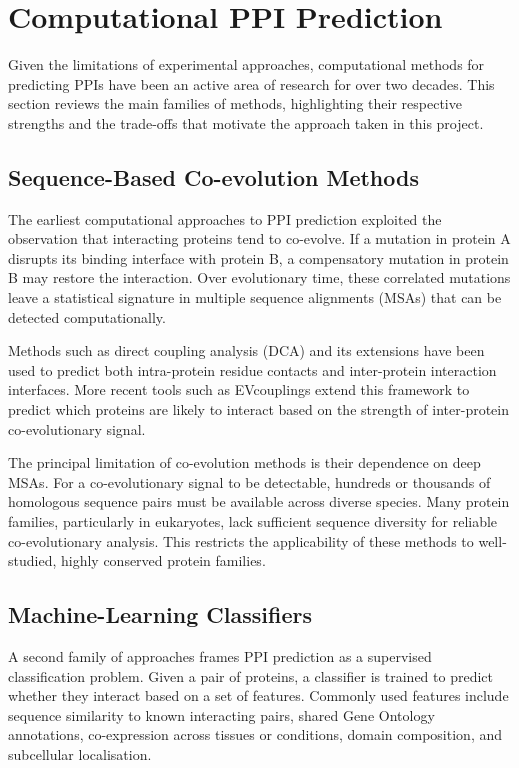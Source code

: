 \section{Computational PPI Prediction}
\label{sec:bg-comp-ppi}

Given the limitations of experimental approaches, computational methods for predicting PPIs have been an active area of research for over two decades.
This section reviews the main families of methods, highlighting their respective strengths and the trade-offs that motivate the approach taken in this project.

\subsection{Sequence-Based Co-evolution Methods}

The earliest computational approaches to PPI prediction exploited the observation that interacting proteins tend to co-evolve.
If a mutation in protein A disrupts its binding interface with protein B, a compensatory mutation in protein B may restore the interaction.
Over evolutionary time, these correlated mutations leave a statistical signature in multiple sequence alignments (MSAs) that can be detected computationally.

Methods such as direct coupling analysis (DCA) and its extensions have been used to predict both intra-protein residue contacts and inter-protein interaction interfaces.
More recent tools such as EVcouplings extend this framework to predict which proteins are likely to interact based on the strength of inter-protein co-evolutionary signal.

The principal limitation of co-evolution methods is their dependence on deep MSAs.
For a co-evolutionary signal to be detectable, hundreds or thousands of homologous sequence pairs must be available across diverse species.
Many protein families, particularly in eukaryotes, lack sufficient sequence diversity for reliable co-evolutionary analysis.
This restricts the applicability of these methods to well-studied, highly conserved protein families.

\subsection{Machine-Learning Classifiers}

A second family of approaches frames PPI prediction as a supervised classification problem.
Given a pair of proteins, a classifier is trained to predict whether they interact based on a set of features.
Commonly used features include sequence similarity to known interacting pairs, shared Gene Ontology annotations, co-expression across tissues or conditions, domain composition, and subcellular localisation.


